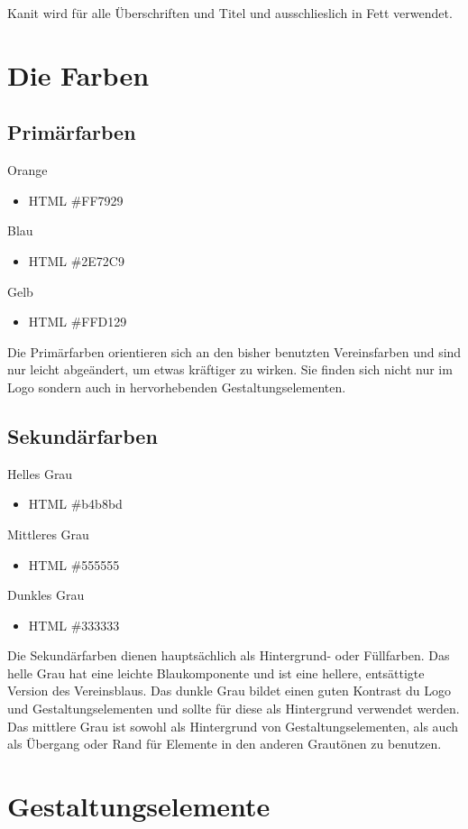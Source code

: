 \documentclass{article}
\begin{document}
Kanit wird für alle Überschriften und Titel und ausschlieslich in Fett verwendet.

\section{Die Farben}

\subsection{Primärfarben}
\cfield[LESOrange]
Orange
\begin{itemize}
\item HTML \#FF7929 
\end{itemize}

\cfield[LESBlue]
Blau
\begin{itemize}
\item HTML \#2E72C9
\end{itemize}

\cfield[LESYellow]
Gelb
\begin{itemize}
\item HTML \#FFD129 
\end{itemize}

Die Primärfarben orientieren sich an den bisher benutzten Vereinsfarben und sind nur leicht abgeändert, um etwas kräftiger zu wirken. Sie finden sich nicht nur im Logo sondern auch in hervorhebenden Gestaltungselementen.

\subsection{Sekundärfarben}
\cfield[SECLight]
Helles Grau
\begin{itemize}
\item HTML \#b4b8bd
\end{itemize}

\cfield[SECMedium]
Mittleres Grau
\begin{itemize}
\item HTML \#555555
\end{itemize}

\cfield[SECDark]
Dunkles Grau
\begin{itemize}
\item HTML \#333333
\end{itemize}

Die Sekundärfarben dienen hauptsächlich als Hintergrund- oder Füllfarben. Das helle Grau hat eine leichte Blaukomponente und ist eine hellere, entsättigte Version des Vereinsblaus. Das dunkle Grau bildet einen guten Kontrast du Logo und Gestaltungselementen und sollte für diese als Hintergrund verwendet werden. Das mittlere Grau ist sowohl als Hintergrund von Gestaltungselementen, als auch als Übergang oder Rand für Elemente in den anderen Grautönen zu benutzen.

\section{Gestaltungselemente}
\end{document}

